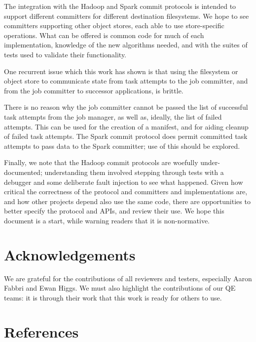 \documentclass[conference]{IEEEtran}
\begin{document}
The integration with the Hadoop and Spark commit protocols is intended
to support different committers for different destination filesystems.
We hope to see committers supporting other object stores, each
able to use store-specific operations.
What can be offered is common code for much of each implementation,
knowledge of the new algorithms needed, and
with the suites of tests used to validate their functionality.

One recurrent issue which this work has shown is that using the
filesystem or object store to communicate state from task attempts
to the job committer, and from the job committer to successor
applications, is brittle.

There is no reason why the job committer cannot be passed the list of
successful task attempts from the job manager, as well as, ideally,
the list of failed attempts.
This can be used for the creation of a manifest, and for aiding cleanup
of failed task attempts.
The Spark commit protocol does permit committed task attempts to pass data
to the Spark committer;
use of this should be explored.


Finally, we note that the Hadoop commit protocols are woefully under-documented;
understanding them involved stepping through tests with a debugger and
some deliberate fault injection to see what happened.
Given how critical the correctness of the protocol and committers and implementations
are, and how other projects depend also use the same code, there
are opportunities to better specify the protocol and APIs, and review
their use.
We hope this document is a start, while warning readers that it is non-normative.


\section*{Acknowledgements}
\label{sec:acknowledgements}

We are grateful for the contributions of all reviewers and testers, especially
Aaron Fabbri and Ewan Higgs.
We must also highlight the contributions of our QE teams: it is through
their work that this work is ready for others to use.


\section{References}
\label{sec:references}




\end{document}
